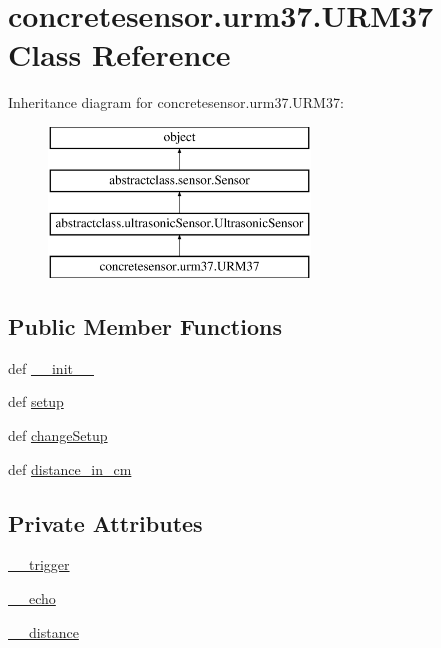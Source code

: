 \hypertarget{classconcretesensor_1_1urm37_1_1URM37}{}\section{concretesensor.\+urm37.\+U\+R\+M37 Class Reference}
\label{classconcretesensor_1_1urm37_1_1URM37}
Inheritance diagram for concretesensor.\+urm37.\+U\+R\+M37\+:\begin{figure}[H]
\begin{center}
\leavevmode
\includegraphics[height=4.000000cm]{classconcretesensor_1_1urm37_1_1URM37}
\end{center}
\end{figure}
\subsection*{Public Member Functions}
\begin{DoxyCompactItemize}
\item 
def \hyperlink{classconcretesensor_1_1urm37_1_1URM37_acc6f88ff52d0d7b5d12c6a94a3f61a7f}{\+\_\+\+\_\+init\+\_\+\+\_\+}
\item 
def \hyperlink{classconcretesensor_1_1urm37_1_1URM37_a40add1b4a9701ca4ec8a858916882b85}{setup}
\item 
def \hyperlink{classconcretesensor_1_1urm37_1_1URM37_a7c8ca28c322f241a56c43381b92c9c1b}{change\+Setup}
\item 
def \hyperlink{classconcretesensor_1_1urm37_1_1URM37_a97e0edbc173d4725c46a6fc65f348bac}{distance\+\_\+in\+\_\+cm}
\end{DoxyCompactItemize}
\subsection*{Private Attributes}
\begin{DoxyCompactItemize}
\item 
\hyperlink{classconcretesensor_1_1urm37_1_1URM37_a867e5be11fa91b5ada70e1fa41eb7c55}{\+\_\+\+\_\+trigger}
\item 
\hyperlink{classconcretesensor_1_1urm37_1_1URM37_af182d1830ad908fe03ca53b49230745c}{\+\_\+\+\_\+echo}
\item 
\hyperlink{classconcretesensor_1_1urm37_1_1URM37_a822064350a6fccb6e4d434f9db340f0f}{\+\_\+\+\_\+distance}
\end{DoxyCompactItemize}


